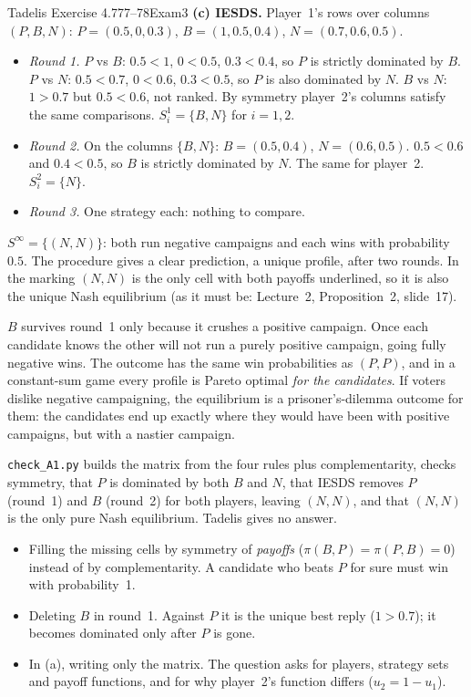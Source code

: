 \begin{exsol}{Tadelis Exercise 4.7}{77--78}{Exam}{3}
\textbf{(c) IESDS.} Player~1's rows over columns $(P,B,N)$: $P = (0.5, 0, 0.3)$,
$B = (1, 0.5, 0.4)$, $N = (0.7, 0.6, 0.5)$.
\begin{itemize}
  \item \emph{Round 1.} $P$ vs $B$: $0.5 < 1$, $0 < 0.5$, $0.3 < 0.4$, so $P$ is strictly dominated
  by $B$. $P$ vs $N$: $0.5 < 0.7$, $0 < 0.6$, $0.3 < 0.5$, so $P$ is also dominated by $N$.
  $B$ vs $N$: $1 > 0.7$ but $0.5 < 0.6$, not ranked. By symmetry player~2's columns satisfy the
  same comparisons. $S_i^1 = \{B, N\}$ for $i = 1, 2$.
  \item \emph{Round 2.} On the columns $\{B, N\}$: $B = (0.5, 0.4)$, $N = (0.6, 0.5)$. $0.5 < 0.6$
  and $0.4 < 0.5$, so $B$ is strictly dominated by $N$. The same for player~2.
  $S_i^2 = \{N\}$.
  \item \emph{Round 3.} One strategy each: nothing to compare.
\end{itemize}
$S^\infty = \{(N, N)\}$: both run negative campaigns and each wins with probability $0.5$. The
procedure gives a clear prediction, a unique profile, after two rounds. In the marking $(N,N)$ is
the only cell with both payoffs underlined, so it is also the unique Nash equilibrium (as it must
be: Lecture~2, Proposition~2, slide~17).

\interp $B$ survives round~1 only because it crushes a positive campaign. Once each candidate
knows the other will not run a purely positive campaign, going fully negative wins. The outcome
has the same win probabilities as $(P,P)$, and in a constant-sum game every profile is Pareto
optimal \emph{for the candidates}. If voters dislike negative campaigning, the equilibrium is a
prisoner's-dilemma outcome for them: the candidates end up exactly where they would have been with
positive campaigns, but with a nastier campaign.

\verify \texttt{check\_A1.py} builds the matrix from the four rules plus complementarity, checks
symmetry, that $P$ is dominated by both $B$ and $N$, that IESDS removes $P$ (round~1) and $B$
(round~2) for both players, leaving $(N, N)$, and that $(N,N)$ is the only pure Nash equilibrium.
Tadelis gives no answer.

\mistakes
\begin{itemize}
  \item Filling the missing cells by symmetry of \emph{payoffs} ($\pi(B,P) = \pi(P,B) = 0$) instead
  of by complementarity. A candidate who beats $P$ for sure must win with probability~1.
  \item Deleting $B$ in round~1. Against $P$ it is the unique best reply ($1 > 0.7$); it becomes
  dominated only after $P$ is gone.
  \item In (a), writing only the matrix. The question asks for players, strategy sets and payoff
  functions, and for why player~2's function differs ($u_2 = 1 - u_1$).
\end{itemize}


\end{exsol}
